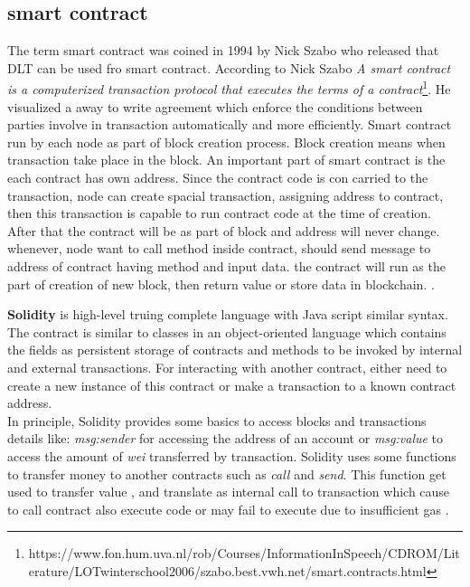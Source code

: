 \subsection{smart contract}
 The term smart contract was coined in 1994 by Nick Szabo who released that DLT can be used fro smart contract. 
According to Nick Szabo \textit{A smart contract is a computerized transaction protocol that executes the terms of a contract}\footnote{https://www.fon.hum.uva.nl/rob/Courses/InformationInSpeech/CDROM/Literature/LOTwinterschool2006/szabo.best.vwh.net/smart.contracts.html}. He visualized a away  to write agreement which enforce the conditions between parties involve in transaction automatically and more efficiently.
Smart contract run by each node as part of block creation process. Block creation means when transaction take place in the block.
An important part of smart contract is the each contract has own address. Since the contract code is con carried to the transaction, node can create  spacial transaction, assigning address to contract, then this transaction is capable to run contract code at the time of creation.\\
After that the contract will be as part of block and address will never change. whenever, node want to call method inside contract, should send message to address of contract having method and input data.
the contract will run as the part of creation of new block, then return value or store data in blockchain. \cite{Payrott}.

\textbf{Solidity} is high-level truing complete language with Java script similar syntax. The contract is similar to classes in an object-oriented language which contains the fields as persistent storage of contracts and methods to be invoked by internal and external transactions. For interacting with another contract, either need to create a new instance of this contract or make a transaction to a known contract address.\\
In principle, Solidity provides some basics to access blocks and transactions details like: \textit{msg:sender} for accessing the address of an account or \textit{msg:value} to access the amount of \textit{wei} transferred by transaction. Solidity uses some functions to transfer money to another contracts such as \textit{call} and \textit{send}. This function get used to transfer value , and translate as internal call to transaction which cause to call contract also execute code or may fail to execute due to insufficient gas \cite{Ilya}.


